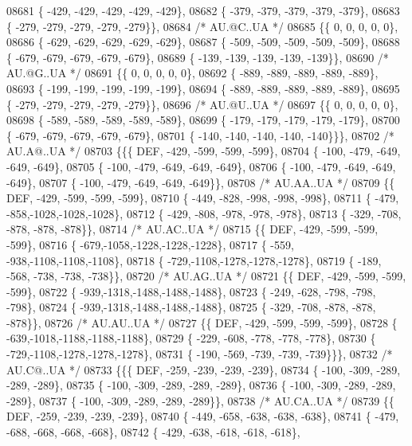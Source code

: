 \begin{DoxyCode}
08681 \{ -429, -429, -429, -429, -429\},
08682 \{ -379, -379, -379, -379, -379\},
08683 \{ -279, -279, -279, -279, -279\}\},
08684 \textcolor{comment}{/* AU.@C..UA */}
08685 \{\{    0,    0,    0,    0,    0\},
08686 \{ -629, -629, -629, -629, -629\},
08687 \{ -509, -509, -509, -509, -509\},
08688 \{ -679, -679, -679, -679, -679\},
08689 \{ -139, -139, -139, -139, -139\}\},
08690 \textcolor{comment}{/* AU.@G..UA */}
08691 \{\{    0,    0,    0,    0,    0\},
08692 \{ -889, -889, -889, -889, -889\},
08693 \{ -199, -199, -199, -199, -199\},
08694 \{ -889, -889, -889, -889, -889\},
08695 \{ -279, -279, -279, -279, -279\}\},
08696 \textcolor{comment}{/* AU.@U..UA */}
08697 \{\{    0,    0,    0,    0,    0\},
08698 \{ -589, -589, -589, -589, -589\},
08699 \{ -179, -179, -179, -179, -179\},
08700 \{ -679, -679, -679, -679, -679\},
08701 \{ -140, -140, -140, -140, -140\}\}\},
08702 \textcolor{comment}{/* AU.A@..UA */}
08703 \{\{\{  DEF, -429, -599, -599, -599\},
08704 \{ -100, -479, -649, -649, -649\},
08705 \{ -100, -479, -649, -649, -649\},
08706 \{ -100, -479, -649, -649, -649\},
08707 \{ -100, -479, -649, -649, -649\}\},
08708 \textcolor{comment}{/* AU.AA..UA */}
08709 \{\{  DEF, -429, -599, -599, -599\},
08710 \{ -449, -828, -998, -998, -998\},
08711 \{ -479, -858,-1028,-1028,-1028\},
08712 \{ -429, -808, -978, -978, -978\},
08713 \{ -329, -708, -878, -878, -878\}\},
08714 \textcolor{comment}{/* AU.AC..UA */}
08715 \{\{  DEF, -429, -599, -599, -599\},
08716 \{ -679,-1058,-1228,-1228,-1228\},
08717 \{ -559, -938,-1108,-1108,-1108\},
08718 \{ -729,-1108,-1278,-1278,-1278\},
08719 \{ -189, -568, -738, -738, -738\}\},
08720 \textcolor{comment}{/* AU.AG..UA */}
08721 \{\{  DEF, -429, -599, -599, -599\},
08722 \{ -939,-1318,-1488,-1488,-1488\},
08723 \{ -249, -628, -798, -798, -798\},
08724 \{ -939,-1318,-1488,-1488,-1488\},
08725 \{ -329, -708, -878, -878, -878\}\},
08726 \textcolor{comment}{/* AU.AU..UA */}
08727 \{\{  DEF, -429, -599, -599, -599\},
08728 \{ -639,-1018,-1188,-1188,-1188\},
08729 \{ -229, -608, -778, -778, -778\},
08730 \{ -729,-1108,-1278,-1278,-1278\},
08731 \{ -190, -569, -739, -739, -739\}\}\},
08732 \textcolor{comment}{/* AU.C@..UA */}
08733 \{\{\{  DEF, -259, -239, -239, -239\},
08734 \{ -100, -309, -289, -289, -289\},
08735 \{ -100, -309, -289, -289, -289\},
08736 \{ -100, -309, -289, -289, -289\},
08737 \{ -100, -309, -289, -289, -289\}\},
08738 \textcolor{comment}{/* AU.CA..UA */}
08739 \{\{  DEF, -259, -239, -239, -239\},
08740 \{ -449, -658, -638, -638, -638\},
08741 \{ -479, -688, -668, -668, -668\},
08742 \{ -429, -638, -618, -618, -618\},

\end{DoxyCode}
